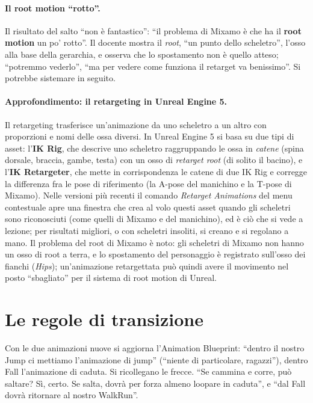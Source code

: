 \paragraph{Il root motion ``rotto''.} Il risultato del salto ``non è fantastico'':
``il problema di Mixamo è che ha il \textbf{root motion} un po' rotto''. Il docente
mostra il \emph{root}, ``un punto dello scheletro'', l'osso alla base della gerarchia, e
osserva che lo spostamento non è quello atteso; ``potremmo vederlo'', ``ma per vedere come
funziona il retarget va benissimo''. Si potrebbe sistemare in seguito.

\paragraph{Approfondimento: il retargeting in Unreal Engine 5.} Il retargeting trasferisce
un'animazione da uno scheletro a un altro con proporzioni e nomi delle ossa diversi. In
Unreal Engine 5 si basa su due tipi di asset: l'\textbf{IK Rig}, che descrive uno
scheletro raggruppando le ossa in \emph{catene} (spina dorsale, braccia, gambe, testa)
con un osso di \emph{retarget root} (di solito il bacino), e l'\textbf{IK Retargeter},
che mette in corrispondenza le catene di due IK Rig e corregge la differenza fra le pose
di riferimento (la A-pose del manichino e la T-pose di Mixamo). Nelle versioni più recenti il
comando \emph{Retarget Animations} del menu contestuale apre una finestra che crea al
volo questi asset quando gli scheletri sono riconosciuti (come quelli di Mixamo e del
manichino), ed è ciò che si vede a lezione; per risultati migliori, o con scheletri
insoliti, si creano e si regolano a mano. Il problema del root di Mixamo è noto: gli
scheletri di Mixamo non hanno un osso di root a terra, e lo spostamento del personaggio
è registrato sull'osso dei fianchi (\emph{Hips}); un'animazione retargettata può quindi
avere il movimento nel posto ``sbagliato'' per il sistema di root motion di Unreal.

\section{Le regole di transizione}
\label{ue9:sec:transizioni}

Con le due animazioni nuove si aggiorna l'Animation Blueprint: ``dentro il nostro Jump
ci mettiamo l'animazione di jump'' (``niente di particolare, ragazzi''), dentro Fall
l'animazione di caduta. Si ricollegano le frecce. ``Se cammina e corre, può saltare? Sì,
certo. Se salta, dovrà per forza almeno loopare in caduta'', e ``dal Fall dovrà ritornare
al nostro WalkRun''.

